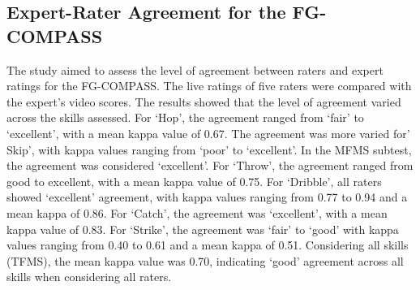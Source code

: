 \documentclass[
  man,
  colorlinks=true,linkcolor=blue,citecolor=blue,urlcolor=blue]{apa7}
\begin{document}
\subsection{Expert-Rater Agreement for the
FG-COMPASS}\label{expert-rater-agreement-for-the-fg-compass}

The study aimed to assess the level of agreement between raters and
expert ratings for the FG-COMPASS. The live ratings of five raters were
compared with the expert's video scores. The results showed that the
level of agreement varied across the skills assessed. For `Hop', the
agreement ranged from `fair' to `excellent', with a mean kappa value of
0.67. The agreement was more varied for' Skip', with kappa values
ranging from `poor' to `excellent'. In the MFMS subtest, the agreement
was considered `excellent'. For `Throw', the agreement ranged from good
to excellent, with a mean kappa value of 0.75. For `Dribble', all raters
showed `excellent' agreement, with kappa values ranging from 0.77 to
0.94 and a mean kappa of 0.86. For `Catch', the agreement was
`excellent', with a mean kappa value of 0.83. For `Strike', the
agreement was `fair' to `good' with kappa values ranging from 0.40 to
0.61 and a mean kappa of 0.51. Considering all skills (TFMS), the mean
kappa value was 0.70, indicating `good' agreement across all skills when
considering all raters.
\end{document}

